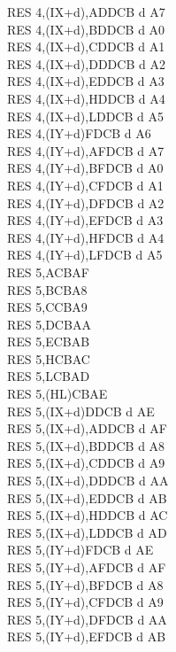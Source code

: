 \documentclass[12pt,twoside,openright,a4paper]{book}
\begin{document}
\begin{multicols}{3}
{\begin{tabbing}
		RES 4,(IX+d),A\UNDOC\>DDCB d A7\\
		RES 4,(IX+d),B\UNDOC\>DDCB d A0\\
		RES 4,(IX+d),C\UNDOC\>DDCB d A1\\
		RES 4,(IX+d),D\UNDOC\>DDCB d A2\\
		RES 4,(IX+d),E\UNDOC\>DDCB d A3\\
		RES 4,(IX+d),H\UNDOC\>DDCB d A4\\
		RES 4,(IX+d),L\UNDOC\>DDCB d A5\\
		RES 4,(IY+d)\>FDCB d A6\\
		RES 4,(IY+d),A\UNDOC\>FDCB d A7\\
		RES 4,(IY+d),B\UNDOC\>FDCB d A0\\
		RES 4,(IY+d),C\UNDOC\>FDCB d A1\\
		RES 4,(IY+d),D\UNDOC\>FDCB d A2\\
		RES 4,(IY+d),E\UNDOC\>FDCB d A3\\
		RES 4,(IY+d),H\UNDOC\>FDCB d A4\\
		RES 4,(IY+d),L\UNDOC\>FDCB d A5\\
		RES 5,A\>CBAF\\
		RES 5,B\>CBA8\\
		RES 5,C\>CBA9\\
		RES 5,D\>CBAA\\
		RES 5,E\>CBAB\\
		RES 5,H\>CBAC\\
		RES 5,L\>CBAD\\
		RES 5,(HL)\>CBAE\\
		RES 5,(IX+d)\>DDCB d AE\\
		RES 5,(IX+d),A\UNDOC\>DDCB d AF\\
		RES 5,(IX+d),B\UNDOC\>DDCB d A8\\
		RES 5,(IX+d),C\UNDOC\>DDCB d A9\\
		RES 5,(IX+d),D\UNDOC\>DDCB d AA\\
		RES 5,(IX+d),E\UNDOC\>DDCB d AB\\
		RES 5,(IX+d),H\UNDOC\>DDCB d AC\\
		RES 5,(IX+d),L\UNDOC\>DDCB d AD\\
		RES 5,(IY+d)\>FDCB d AE\\
		RES 5,(IY+d),A\UNDOC\>FDCB d AF\\
		RES 5,(IY+d),B\UNDOC\>FDCB d A8\\
		RES 5,(IY+d),C\UNDOC\>FDCB d A9\\
		RES 5,(IY+d),D\UNDOC\>FDCB d AA\\
		RES 5,(IY+d),E\UNDOC\>FDCB d AB\\

\end{tabbing}}
\end{multicols}
\end{document}
